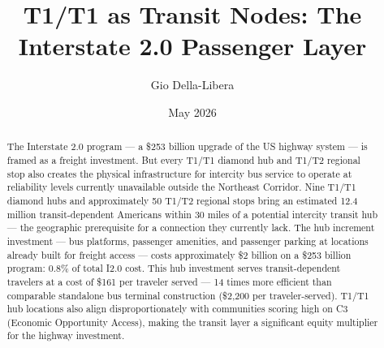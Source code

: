 \documentclass[12pt]{article}
\title{T1/T1 as Transit Nodes: The Interstate 2.0 Passenger Layer}
\author{Gio Della-Libera}
\date{May 2026}
\begin{document}
\maketitle
\begin{abstract}
The Interstate 2.0 program --- a \$253 billion upgrade of the US highway system --- is framed as a freight investment. But every T1/T1 diamond hub and T1/T2 regional stop also creates the physical infrastructure for intercity bus service to operate at reliability levels currently unavailable outside the Northeast Corridor. Nine T1/T1 diamond hubs and approximately 50 T1/T2 regional stops bring an estimated 12.4 million transit-dependent Americans within 30 miles of a potential intercity transit hub --- the geographic prerequisite for a connection they currently lack. The hub increment investment --- bus platforms, passenger amenities, and passenger parking at locations already built for freight access --- costs approximately \$2 billion on a \$253 billion program: 0.8\% of total I2.0 cost. This hub investment serves transit-dependent travelers at a cost of \$161 per traveler served --- 14 times more efficient than comparable standalone bus terminal construction (\$2,200 per traveler-served). T1/T1 hub locations also align disproportionately with communities scoring high on C3 (Economic Opportunity Access), making the transit layer a significant equity multiplier for the highway investment.
\end{abstract}









\end{document}
